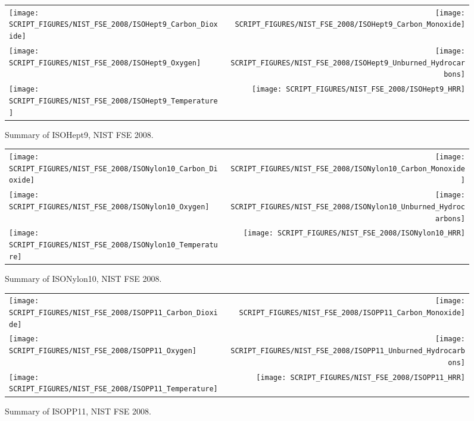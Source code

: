 \begin{figure}[h]
\begin{tabular*}{\textwidth}{l@{\extracolsep{\fill}}r}
\texttt{[image: SCRIPT\_FIGURES/NIST\_FSE\_2008/ISOHept9\_Carbon\_Dioxide]} &
\texttt{[image: SCRIPT\_FIGURES/NIST\_FSE\_2008/ISOHept9\_Carbon\_Monoxide]} \\
\texttt{[image: SCRIPT\_FIGURES/NIST\_FSE\_2008/ISOHept9\_Oxygen]} &
\texttt{[image: SCRIPT\_FIGURES/NIST\_FSE\_2008/ISOHept9\_Unburned\_Hydrocarbons]} \\
\texttt{[image: SCRIPT\_FIGURES/NIST\_FSE\_2008/ISOHept9\_Temperature]} &
\texttt{[image: SCRIPT\_FIGURES/NIST\_FSE\_2008/ISOHept9\_HRR]}
\end{tabular*}
\caption[Summary of ISOHept9, NIST FSE 2008]{Summary of ISOHept9, NIST FSE 2008.}
\label{NIST_FSE_1994_ISOHept9}
\end{figure}

\begin{figure}[h]
\begin{tabular*}{\textwidth}{l@{\extracolsep{\fill}}r}
\texttt{[image: SCRIPT\_FIGURES/NIST\_FSE\_2008/ISONylon10\_Carbon\_Dioxide]} &
\texttt{[image: SCRIPT\_FIGURES/NIST\_FSE\_2008/ISONylon10\_Carbon\_Monoxide]} \\
\texttt{[image: SCRIPT\_FIGURES/NIST\_FSE\_2008/ISONylon10\_Oxygen]} &
\texttt{[image: SCRIPT\_FIGURES/NIST\_FSE\_2008/ISONylon10\_Unburned\_Hydrocarbons]} \\
\texttt{[image: SCRIPT\_FIGURES/NIST\_FSE\_2008/ISONylon10\_Temperature]} &
\texttt{[image: SCRIPT\_FIGURES/NIST\_FSE\_2008/ISONylon10\_HRR]}
\end{tabular*}
\caption[Summary of ISONylon10, NIST FSE 2008]{Summary of ISONylon10, NIST FSE 2008.}
\label{NIST_FSE_1994_ISONylon10}
\end{figure}

\begin{figure}[h]
\begin{tabular*}{\textwidth}{l@{\extracolsep{\fill}}r}
\texttt{[image: SCRIPT\_FIGURES/NIST\_FSE\_2008/ISOPP11\_Carbon\_Dioxide]} &
\texttt{[image: SCRIPT\_FIGURES/NIST\_FSE\_2008/ISOPP11\_Carbon\_Monoxide]} \\
\texttt{[image: SCRIPT\_FIGURES/NIST\_FSE\_2008/ISOPP11\_Oxygen]} &
\texttt{[image: SCRIPT\_FIGURES/NIST\_FSE\_2008/ISOPP11\_Unburned\_Hydrocarbons]} \\
\texttt{[image: SCRIPT\_FIGURES/NIST\_FSE\_2008/ISOPP11\_Temperature]} &
\texttt{[image: SCRIPT\_FIGURES/NIST\_FSE\_2008/ISOPP11\_HRR]}
\end{tabular*}
\caption[Summary of ISOPP11, NIST FSE 2008]{Summary of ISOPP11, NIST FSE 2008.}
\label{NIST_FSE_1994_ISOPropylene11}
\end{figure}

